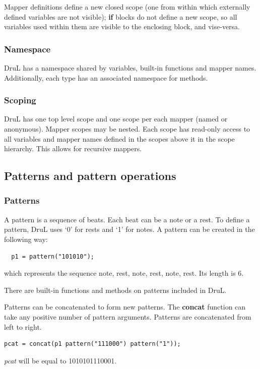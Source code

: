 \documentclass[11pt,twoside]{article}
\begin{document}
Mapper definitions define a new closed scope (one from within which externally defined variables are not visible); \textbf{if} blocks do not define a new scope, so all variables used within them are visible to the enclosing  block, and vise-versa.

\subsubsection{Namespace}

DruL has a namespace shared by variables, built-in functions and 
mapper names. Additionally, each type has an associated namespace for methods.

\subsubsection{Scoping}

DruL has one top level scope and one scope per each mapper
(named or anonymous). Mapper scopes may be nested.
Each scope has read-only access to all variables and mapper names
defined in the scopes above it in the scope hierarchy.
This allows for recursive mappers.





\subsection{Patterns and pattern operations}

\subsubsection{Patterns}

A pattern is a sequence of beats.  Each beat can be a note or a rest.
To define a pattern, DruL uses `0' for rests and `1' for notes.
A pattern can be created in the following way:
\begin{verbatim}
  p1 = pattern("101010");
\end{verbatim}
which represents the sequence {note, rest, note, rest, note, rest}.
Its length is $6$.

There are built-in functions and methods on patterns included in DruL.

Patterns can be concatenated to form new patterns.  The \textbf{concat} function can take any positive number of pattern arguments.  Patterns are concatenated from left to right.
\begin{verbatim}
pcat = concat(p1 pattern("111000") pattern("1"));
\end{verbatim}
\textit{pcat} will be equal to 1010101110001.
\end{document}
